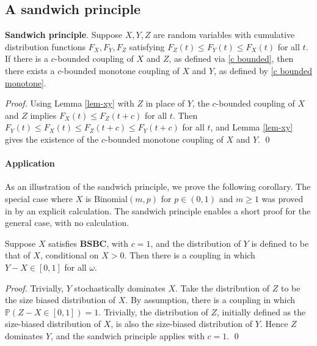 \documentclass[smallextended,envcountsect]{svjour3}
\begin{document}
\subsection{A sandwich principle}

\begin{corollary} {\bf Sandwich principle}. \label{cor sandwich}  Suppose $X,Y,Z$ are random variables with cumulative distribution functions $F_X, F_Y, F_Z$ satisfying $F_Z(t) \le F_Y(t) \le F_X(t)$ for all $t$.  If there is a $c$-bounded coupling of $X$ and $Z$, as defined via \eqref{c bounded}, then there exists a $c$-bounded monotone coupling of $X$ and $Y$, as defined by \eqref{c bounded monotone}.
\end{corollary}

\begin{proof}  Using Lemma \ref{lem-xy} with $Z$ in place of $Y$, the $c$-bounded coupling of $X$ and $Z$ implies $F_X(t) \le F_Z(t+c)$ for all $t$.  Then $F_Y(t) \le F_X(t) \le F_Z(t+c) \le F_Y(t+c)$ for all $t$, and Lemma \ref{lem-xy} gives the existence of the $c$-bounded monotone coupling of $X$ and $Y$.
\qed \end{proof}

\paragraph{\bf Application}
As an illustration of the sandwich principle, we prove the following corollary.  The special case where
$X$ is Binomial$(m,p)$ for $p \in (0,1)$ and $m \ge 1$ was proved in \cite[Lemmas 3.2, 3.3]{GP}
by an explicit calculation.  The sandwich principle enables a short proof for the general case, with no calculation.

\begin{corollary}\label{cor condition sandwich}
Suppose $X$ satisfies {\bf BSBC}, with $c=1$, and the distribution of $Y$ is defined to be that of $X$, conditional on $X > 0$.
Then there is a coupling in which $Y-X \in [0,1]$ for all $\omega$.
\end{corollary}
\begin{proof}
Trivially, $Y$ stochastically dominates $X$.  Take the distribution of $Z$ to be the size biased distribution of $X$.  By assumption, there is a coupling in which ${\mathbb{P}}(Z-X \in [0,1])=1$.
Trivially, the distribution of  $Z$, initially defined as the size-biased distribution of $X$, is also the size-biased distribution of $Y$. Hence $Z$ dominates $Y$, and the sandwich principle applies with $c = 1$.
\qed \end{proof}
\end{document}
